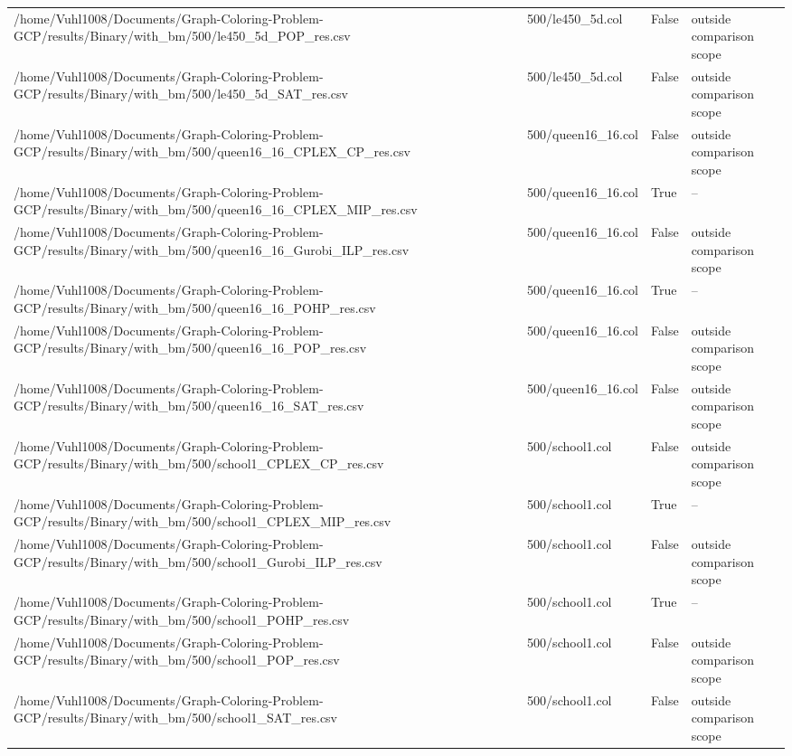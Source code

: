 \begin{table}[htbp]
\begin{tabular}{llll}
/home/Vuhl1008/Documents/Graph-Coloring-Problem-GCP/results/Binary/with\_bm/500/le450\_5d\_POP\_res.csv & 500/le450\_5d.col & False & outside comparison scope \\
/home/Vuhl1008/Documents/Graph-Coloring-Problem-GCP/results/Binary/with\_bm/500/le450\_5d\_SAT\_res.csv & 500/le450\_5d.col & False & outside comparison scope \\
/home/Vuhl1008/Documents/Graph-Coloring-Problem-GCP/results/Binary/with\_bm/500/queen16\_16\_CPLEX\_CP\_res.csv & 500/queen16\_16.col & False & outside comparison scope \\
/home/Vuhl1008/Documents/Graph-Coloring-Problem-GCP/results/Binary/with\_bm/500/queen16\_16\_CPLEX\_MIP\_res.csv & 500/queen16\_16.col & True & -- \\
/home/Vuhl1008/Documents/Graph-Coloring-Problem-GCP/results/Binary/with\_bm/500/queen16\_16\_Gurobi\_ILP\_res.csv & 500/queen16\_16.col & False & outside comparison scope \\
/home/Vuhl1008/Documents/Graph-Coloring-Problem-GCP/results/Binary/with\_bm/500/queen16\_16\_POHP\_res.csv & 500/queen16\_16.col & True & -- \\
/home/Vuhl1008/Documents/Graph-Coloring-Problem-GCP/results/Binary/with\_bm/500/queen16\_16\_POP\_res.csv & 500/queen16\_16.col & False & outside comparison scope \\
/home/Vuhl1008/Documents/Graph-Coloring-Problem-GCP/results/Binary/with\_bm/500/queen16\_16\_SAT\_res.csv & 500/queen16\_16.col & False & outside comparison scope \\
/home/Vuhl1008/Documents/Graph-Coloring-Problem-GCP/results/Binary/with\_bm/500/school1\_CPLEX\_CP\_res.csv & 500/school1.col & False & outside comparison scope \\
/home/Vuhl1008/Documents/Graph-Coloring-Problem-GCP/results/Binary/with\_bm/500/school1\_CPLEX\_MIP\_res.csv & 500/school1.col & True & -- \\
/home/Vuhl1008/Documents/Graph-Coloring-Problem-GCP/results/Binary/with\_bm/500/school1\_Gurobi\_ILP\_res.csv & 500/school1.col & False & outside comparison scope \\
/home/Vuhl1008/Documents/Graph-Coloring-Problem-GCP/results/Binary/with\_bm/500/school1\_POHP\_res.csv & 500/school1.col & True & -- \\
/home/Vuhl1008/Documents/Graph-Coloring-Problem-GCP/results/Binary/with\_bm/500/school1\_POP\_res.csv & 500/school1.col & False & outside comparison scope \\
/home/Vuhl1008/Documents/Graph-Coloring-Problem-GCP/results/Binary/with\_bm/500/school1\_SAT\_res.csv & 500/school1.col & False & outside comparison scope \\

\end{tabular}
\end{table}
